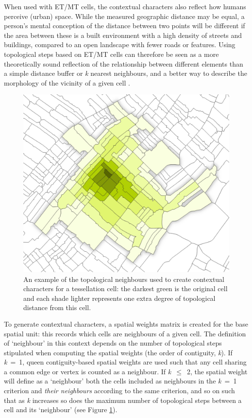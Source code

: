 \documentclass[a4paper, nobind]{templates/ociamthesis}
\begin{document}
When used with ET/MT cells, the contextual characters also reflect how humans perceive (urban) space. While the measured geographic distance may be equal, a person's mental conception of the distance between two points will be different if the area between these is a built environment with a high density of streets and buildings, compared to an open landscape with fewer roads or features. Using topological steps based on ET/MT cells can therefore be seen as a more theoretically sound reflection of the relationship between different elements than a simple distance buffer or \emph{k} nearest neighbours, and a better way to describe the morphology of the vicinity of a given cell \citep{fleischmann2020tessellation}.

\begin{figure}

{\centering \includegraphics[width=0.65\linewidth]{figures/spatial_weights} 

}

\caption[Neighbours of a tessellation cell.]{An example of the topological neighbours used to create contextual characters for a tessellation cell: the darkest green is the original cell and each shade lighter represents one extra degree of topological distance from this cell.}\label{fig:spatial-weights}
\end{figure}

To generate contextual characters, a spatial weights matrix is created for the base spatial unit: this records which cells are neighbours of a given cell. The definition of `neighbour' in this context depends on the number of topological steps stipulated when computing the spatial weights (the order of contiguity, \emph{k}). If \emph{k}~=~1, queen contiguity-based spatial weights are used such that any cell sharing a common edge or vertex is counted as a neighbour. If \emph{k}~\(\leq\)~2, the spatial weight will define as a `neighbour' both the cells included as neighbours in the \emph{k}~=~1 criterion and \emph{their neighbours} according to the same criterion, and so on such that as \emph{k} increases so does the maximum number of topological steps between a cell and its `neighbour' (see Figure \ref{fig:spatial-weights}).
\end{document}
